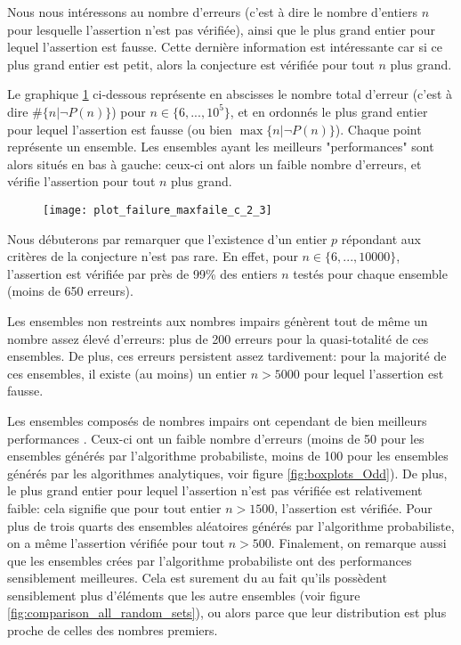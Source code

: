 \documentclass[../main.text]{report}
\begin{document}
Nous nous intéressons au nombre d'erreurs (c'est à dire le nombre d'entiers $n$ pour lesquelle l'assertion n'est pas vérifiée), ainsi que le plus grand entier pour lequel l'assertion est fausse. Cette dernière information est intéressante car si ce plus grand entier est petit, alors la conjecture est vérifiée pour tout $n$ plus grand.

Le graphique \ref{fig:failures_2_3} ci-dessous représente en abscisses le nombre total d'erreur (c'est à dire $\#\{n | \neg P(n)\}$) pour $n \in \{6,...,10^5\}$, et en ordonnés le plus grand entier pour lequel l'assertion est fausse (ou bien $\max \{n | \neg P(n)\}$). Chaque point représente un ensemble. Les ensembles ayant les meilleurs "performances" sont alors situés en bas à gauche: ceux-ci ont alors un faible nombre d'erreurs, et vérifie l'assertion pour tout $n$ plus grand. 

\begin{figure}[H]
\centering
\texttt{[image: plot\_failure\_maxfaile\_c\_2\_3]}
\caption{}
\label{fig:failures_2_3}
\end{figure}

Nous débuterons par remarquer que l'existence d'un entier $p$ répondant aux critères de la conjecture n'est pas rare. En effet, pour $ n \in \{6,...,10000\}$, l'assertion est vérifiée par près de 99\% des entiers $n$ testés pour chaque ensemble (moins de 650 erreurs). 

Les ensembles non restreints aux nombres impairs génèrent tout de même un nombre assez élevé d'erreurs: plus de 200 erreurs pour la quasi-totalité de ces ensembles.
De plus, ces erreurs persistent assez tardivement: pour la majorité de ces ensembles, il existe (au moins) un entier $n > 5000$ pour lequel l'assertion est fausse. 


Les ensembles composés de nombres impairs ont cependant de bien meilleurs performances . Ceux-ci ont un faible nombre d'erreurs (moins de 50 pour les ensembles générés par l'algorithme probabiliste, moins de 100 pour les ensembles générés par les algorithmes analytiques, voir figure \ref{fig:boxplots_Odd}). 
De plus, le plus grand entier pour lequel l'assertion n'est pas vérifiée est relativement faible: cela signifie que pour tout entier $n > 1500$, l'assertion est vérifiée. Pour plus de trois quarts des ensembles aléatoires générés par l'algorithme probabiliste, on a même l'assertion vérifiée pour tout $n > 500$.
Finalement, on remarque aussi que les ensembles crées par l'algorithme probabiliste ont des performances sensiblement meilleures. Cela est surement du au fait qu'ils possèdent sensiblement plus d'éléments que les autre ensembles (voir figure \ref{fig:comparison_all_random_sets}), ou alors parce que leur distribution est plus proche de celles des nombres premiers.
\end{document}

